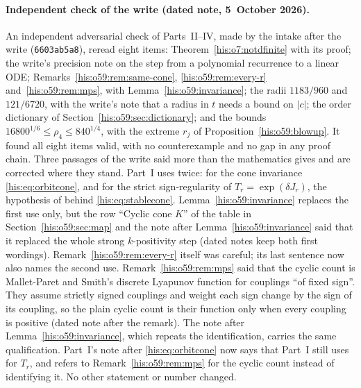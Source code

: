 \documentclass[11pt]{article}
\theoremstyle{remark}\newtheorem{remark}[theorem]{Remark}
\numberwithin{equation}{section}
\begin{document}
\paragraph{Independent check of the write (dated note, 5~October 2026).}
An independent adversarial check of Parts~II--IV, made by the intake after
the write (\texttt{6603ab5a8}), reread eight items: Theorem~\ref{his:o7:notdfinite}
with its proof; the write's precision note on the step from a polynomial
recurrence to a linear ODE; Remarks~\ref{his:o59:rem:same-cone},
\ref{his:o59:rem:every-r} and~\ref{his:o59:rem:mps}, with
Lemma~\ref{his:o59:invariance}; the radii $1183/960$ and $121/6720$, with the
write's note that a radius in $t$ needs a bound on $|c|$; the order
dictionary of Section~\ref{his:o59:sec:dictionary}; and the bounds
$16800^{1/6}\le\rho_4\le840^{1/4}$, with the extreme $r_j$ of
Proposition~\ref{his:o59:blowup}. It found all eight items valid, with no
counterexample and no gap in any proof chain. Three passages of the write
said more than the mathematics gives and are corrected where they stand.
Part~I uses \cite{weiss2021} twice: for the cone invariance
\eqref{his:eq:orbitcone}, and for the strict sign-regularity of
$T_r=\exp(\delta J_r)$, the hypothesis of \cite{alseidi2019} behind
\eqref{his:eq:stablecone}. Lemma~\ref{his:o59:invariance} replaces the first
use only, but the row ``Cyclic cone $K$'' of the table in
Section~\ref{his:o59:sec:map} and the note after
Lemma~\ref{his:o59:invariance} said that it replaced the whole strong
$k$-positivity step (dated notes keep both first wordings).
Remark~\ref{his:o59:rem:every-r} itself was careful; its last sentence now
also names the second use. Remark~\ref{his:o59:rem:mps} said that the
cyclic count is Mallet-Paret and Smith's discrete Lyapunov function for
couplings ``of fixed sign''. They assume strictly signed couplings and
weight each sign change by the sign of its coupling, so the plain cyclic
count is their function only when every coupling is positive (dated note
after the remark). The note after Lemma~\ref{his:o59:invariance}, which
repeats the identification, carries the same qualification. Part~I's note
after \eqref{his:eq:orbitcone} now says that Part~I still uses
\cite{weiss2021} for $T_r$, and refers to Remark~\ref{his:o59:rem:mps} for
the cyclic count instead of identifying it. No other statement or number
changed.
\end{document}
